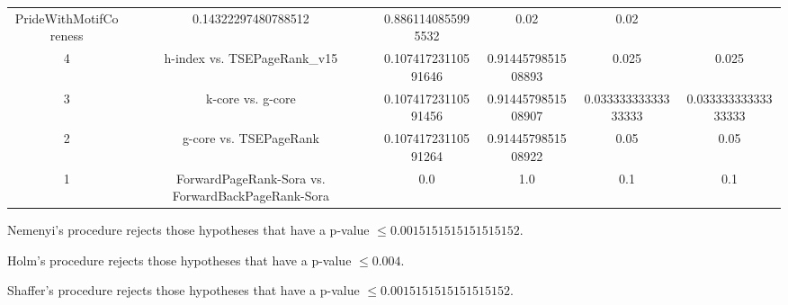 \documentclass[a4paper,10pt]{article}
\begin{document}
\begin{landscape}
\begin{table}[!htp]
\begin{tabular}{cccccc}
PrideWithMotifCoreness&0.14322297480788512&0.8861140855995532&0.02&0.02\\4&h-index vs. TSEPageRank_v15&0.10741723110591646&0.9144579851508893&0.025&0.025\\3&k-core vs. g-core&0.10741723110591456&0.9144579851508907&0.03333333333333333&0.03333333333333333\\2&g-core vs. TSEPageRank&0.10741723110591264&0.9144579851508922&0.05&0.05\\1&ForwardPageRank-Sora vs. ForwardBackPageRank-Sora&0.0&1.0&0.1&0.1\\\hline
\end{tabular}
\end{table}
Nemenyi's procedure rejects those hypotheses that have a p-value $\le0.0015151515151515152$.


Holm's procedure rejects those hypotheses that have a p-value $\le0.004$.


Shaffer's procedure rejects those hypotheses that have a p-value $\le0.0015151515151515152$.



\end{landscape}
\end{document}
